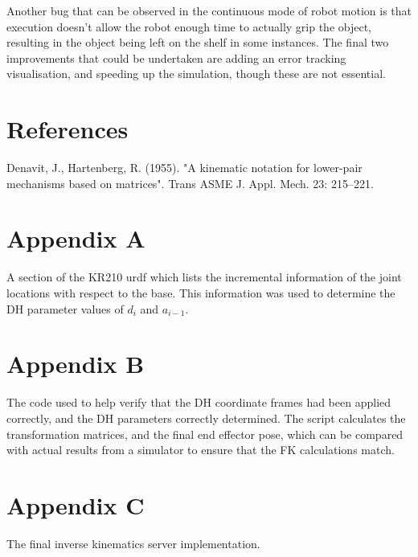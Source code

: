 \documentclass[a4paper]{article}
\begin{document}
Another bug that can be observed in the continuous mode of robot motion is that execution doesn't allow the robot enough time to actually grip the object, resulting in the object being left on the shelf in some instances. The final two improvements that could be undertaken are adding an error tracking visualisation, and speeding up the simulation, though these are not essential.
\section{References}
 Denavit, J., Hartenberg, R. (1955). "A kinematic notation for lower-pair mechanisms based on matrices". Trans ASME J. Appl. Mech. 23: 215–221.
\newpage
\section{Appendix A}
A section of the KR210 urdf which lists the incremental information of the joint locations with respect to the base. This information was used to determine the DH parameter values of $d_i$ and $a_{i-1}$.
\lstset{
	frame=single,
	basicstyle=\ttfamily,
	numbers=left,
	showstringspaces=false,
}

\tiny


\newpage

\section{Appendix B}
\normalsize The code used to help verify that the DH coordinate frames had been applied correctly, and the DH parameters correctly determined. The script calculates the transformation matrices, and the final end effector pose, which can be compared with actual results from a simulator to ensure that the FK calculations match.
\tiny


\newpage

\section{Appendix C}
\normalsize The final inverse kinematics server implementation.
\tiny

\end{document}
